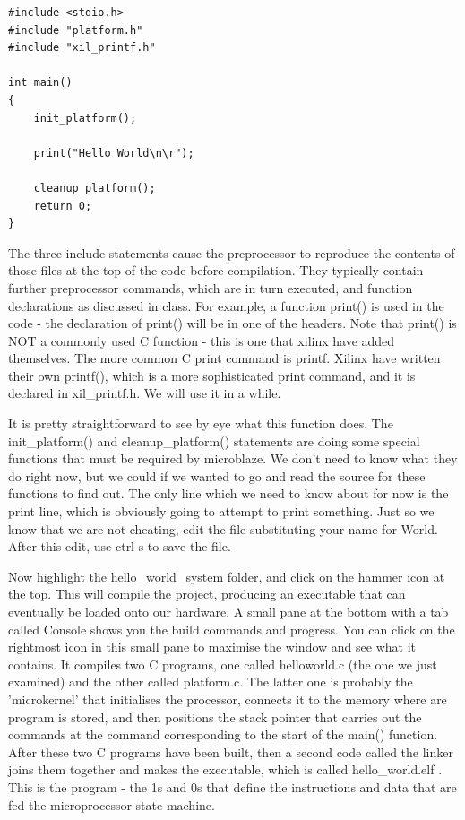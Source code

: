 \documentclass[../physical_computing.tex]{subfiles}
\begin{document}
\begin{verbatim}
#include <stdio.h>
#include "platform.h"
#include "xil_printf.h"

int main()
{
    init_platform();

    print("Hello World\n\r");

    cleanup_platform();
    return 0;
}
\end{verbatim}

The three include statements cause the preprocessor to reproduce the
contents of those files at the top of the code before compilation. They
typically contain further preprocessor commands, which are in turn 
executed, and function declarations as discussed in class. For 
example, a function print() is used in the code - the declaration of
print() will be in one of the headers. Note that print() is NOT a 
commonly used C function - this is one that xilinx have added 
themselves. The more common C print command is printf. Xilinx have 
written their own printf(), which is a more sophisticated print command,
and it is declared in xil\_printf.h. We will use it in a while.

It is pretty straightforward to see by eye what this function does.
The init\_platform() and cleanup\_platform() statements are doing some
special functions that must be required by microblaze. We don't need
to know what they do right now, but we could if we wanted to go and
read the source for these functions to find out. The only line which 
we need to know about for now is the print line, which is obviously 
going to attempt to print something. Just so we know that we are 
not cheating, edit the file substituting your name for World. After
this edit, use ctrl-s to save the file. 

Now highlight the hello\_world\_system folder, and click on the
hammer icon at the top. This will compile the project, producing 
an executable that can eventually be loaded onto our hardware.
A small pane at the bottom with a tab called Console shows you
the build commands and progress. You can click on the rightmost 
icon in this small pane to maximise the window and see what it
contains. It compiles two C programs, one called helloworld.c
(the one we just examined) and the other called platform.c. The latter
one is probably the 'microkernel' that initialises the processor, 
connects it to the memory where are program is stored, and then
positions the stack pointer that carries out the commands at the 
command corresponding to the start of the main() function. After
these two C programs have been built, then a second code called the
linker joins them together and makes the executable, which is called
hello\_world.elf . This is the program - the 1s and 0s that define
the instructions and data that are fed the microprocessor state
machine.
\end{document}

